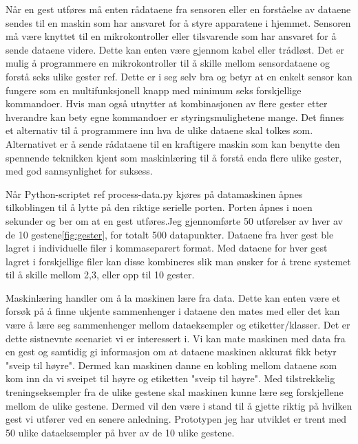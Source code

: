 Når en gest utføres må enten rådataene fra sensoren eller en forståelse av dataene sendes til en maskin som har ansvaret for å styre apparatene i hjemmet. Sensoren må være knyttet til en mikrokontroller eller tilsvarende som har ansvaret for å sende dataene videre. Dette kan enten være gjennom kabel eller trådløst. Det er mulig å programmere en mikrokontroller til å skille mellom sensordataene og forstå seks ulike gester {\color{red} ref}. Dette er i seg selv bra og betyr at en enkelt sensor kan fungere som en multifunksjonell knapp med minimum seks forskjellige kommandoer. Hvis man også utnytter at kombinasjonen av flere gester etter hverandre kan bety egne kommandoer er styringsmulighetene mange. Det finnes et alternativ til å programmere inn hva de ulike dataene skal tolkes som. Alternativet er å sende rådataene til en kraftigere maskin som kan benytte den spennende teknikken kjent som maskinlæring til å forstå enda flere ulike gester, med god sannsynlighet for suksess.

Når Python-scriptet{\color{red} ref process-data.py} kjøres på datamaskinen åpnes tilkoblingen til å lytte på den riktige serielle porten. Porten åpnes i noen sekunder og ber om at en gest utføres.Jeg gjennomførte 50 utførelser av hver av de 10 gestene\ref{fig:gester}, for totalt 500 datapunkter. Dataene fra hver gest ble lagret i individuelle filer i kommaseparert format. Med dataene for hver gest lagret i forskjellige filer kan disse kombineres slik man ønsker for å trene systemet til å skille mellom 2,3, eller opp til 10 gester. 

Maskinlæring handler om å la maskinen lære fra data. Dette kan enten være et forsøk på å finne ukjente sammenhenger i dataene den mates med eller det kan være å lære seg sammenhenger mellom dataeksempler og etiketter/klasser. Det er dette sistnevnte scenariet vi er interessert i. Vi kan mate maskinen med data fra en gest og samtidig gi informasjon om at dataene maskinen akkurat fikk betyr "sveip til høyre". Dermed kan maskinen danne en kobling mellom dataene som kom inn da vi sveipet til høyre og etiketten "sveip til høyre". Med tilstrekkelig treningseksempler fra de ulike gestene skal maskinen kunne lære seg forskjellene mellom de ulike gestene. Dermed vil den være i stand til å gjette riktig på hvilken gest vi utfører ved en senere anledning. Prototypen jeg har utviklet er trent med 50 ulike dataeksempler på hver av de 10 ulike gestene.

